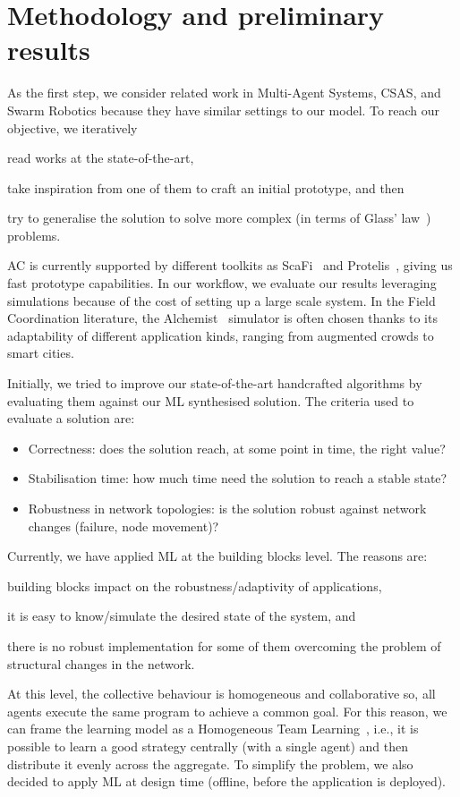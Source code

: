 \documentclass[conference]{IEEEtran}
\begin{document}
\section{Methodology and preliminary results}
%
As the first step, we consider related work in Multi-Agent Systems, CSAS, and Swarm Robotics because they have similar settings to our model.
To reach our objective, we iteratively 
\begin{enumerate*}[label=(\roman*)]
\item read works at the state-of-the-art,
\item take inspiration from one of them to craft an initial prototype, and then
\item try to generalise the solution to solve more complex (in terms of Glass' law~\cite{DBLP:journals/software/Glass01}) problems.
\end{enumerate*}

AC is currently supported by different toolkits as ScaFi~\cite{DBLP:conf/ecoop/CasadeiV16} and Protelis~\cite{DBLP:conf/sac/PianiniVB15}, giving us fast prototype capabilities.
%
In our workflow, we evaluate our results leveraging simulations because of the cost of setting up a large scale system.
%
In the Field Coordination literature, the Alchemist~\cite{alchemist-jos2013} simulator is often chosen thanks to its adaptability of different application kinds, ranging from augmented crowds to smart cities.

Initially, we tried to improve our state-of-the-art handcrafted algorithms by evaluating them against our ML synthesised solution.
%
The criteria used to evaluate a solution are:
\begin{itemize}
    \item Correctness: does the solution reach, at some point in time, the right value?
    \item Stabilisation time: how much time need the solution to reach a stable state?
    \item Robustness in network topologies: is the solution robust against network changes (failure, node movement)?
\end{itemize}

Currently, we have applied ML at the building blocks level.
The reasons are:
\begin{enumerate*}[label=(\roman*)]
\item building blocks impact on the robustness/adaptivity of applications,
\item it is easy to know/simulate the desired state of the system, and
\item there is no robust implementation for some of them overcoming the problem of structural changes in the network.
\end{enumerate*}
%
At this level, the collective behaviour is homogeneous and collaborative so, all agents execute the same program to achieve a common goal.
%
For this reason, we can frame the learning model as a Homogeneous Team Learning~\cite{DBLP:journals/aamas/PanaitL05}, i.e., it is possible to learn a good strategy centrally (with a single agent) and then distribute it evenly across the aggregate.
%
To simplify the problem, we also decided to apply ML at design time (offline, before the application is deployed).
\end{document}
